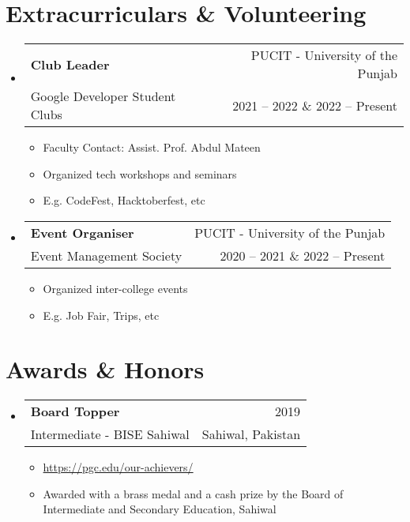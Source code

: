 \documentclass[letterpaper,11pt]{article}
\makeatletter
\newcommand{\resumeItem}[1]{
  \item{
    {#1 \vspace{-4pt}}
  }
}
\newcommand{\resumeSubheading}[4]{
  \vspace{-2pt}\item
    \begin{tabular*}{0.97\textwidth}[t]{l@{\extracolsep{\fill}}r}
      \textbf{#1} & #2 \\
      {\small #3} & {\small #4} \\
    \end{tabular*}\vspace{-10pt}
}
\newcommand{\resumeSubHeadingListStart}{\begin{itemize}[leftmargin=0.15in, label={}]}
\newcommand{\resumeSubHeadingListEnd}{\end{itemize}}
\newcommand{\resumeItemListStart}{\begin{itemize}}
\newcommand{\resumeItemListEnd}{\end{itemize}\vspace{-2pt}}
\makeatother
\begin{document}
\section{Extracurriculars \& Volunteering} 
\resumeSubHeadingListStart
    
    \resumeSubheading
        {Club Leader}{PUCIT - University of the Punjab}
        {Google Developer Student Clubs}{2021 -- 2022 \& 2022 -- Present}
        \resumeItemListStart
            \small\resumeItem{Faculty Contact: Assist. Prof. Abdul Mateen}
            \resumeItem{Organized tech workshops and seminars}
            \resumeItem{E.g. CodeFest, Hacktoberfest, etc}
        \resumeItemListEnd    

    \resumeSubheading
        {Event Organiser}{PUCIT - University of the Punjab}
        {Event Management Society}{2020 -- 2021 \& 2022 -- Present}
        \resumeItemListStart
            \small\resumeItem{Organized inter-college events}
            \small\resumeItem{E.g. Job Fair, Trips, etc}
        \resumeItemListEnd

\resumeSubHeadingListEnd

\section{Awards \& Honors}
\resumeSubHeadingListStart

    \resumeSubheading
        {Board Topper}{2019}
        {Intermediate - BISE Sahiwal}{Sahiwal, Pakistan}
        \resumeItemListStart
            \small\resumeItem{\href{https://pgc.edu/wp-content/uploads/2019/10/69807212_2482536158459889_3093261925052579840_o_2482536155126556.png}{https://pgc.edu/our-achievers/}}
            \resumeItem{Awarded with a brass medal and a cash prize by the Board of Intermediate and Secondary Education, Sahiwal}
        \resumeItemListEnd

\resumeSubHeadingListEnd
\end{document}
